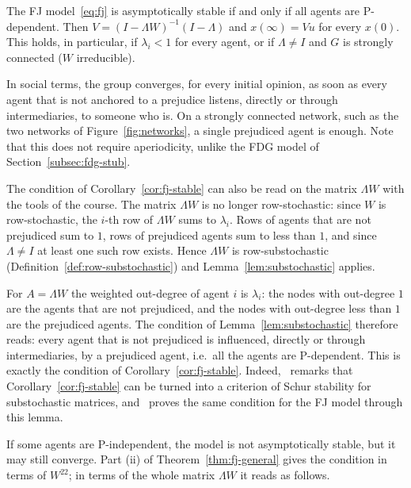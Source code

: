 \begin{corollary}
\label{cor:fj-stable}
The FJ model~\eqref{eq:fj} is asymptotically stable if and only if all agents are
P-dependent. Then $V = (I - \Lambda W)^{-1}(I - \Lambda)$ and $x(\infty) = Vu$ for
every $x(0)$. This holds, in particular, if $\lambda_i < 1$ for every agent, or if
$\Lambda \neq I$ and $G$ is strongly connected ($W$ irreducible).
\end{corollary}

In social terms, the group converges, for every initial opinion, as soon as every agent
that is not anchored to a prejudice listens, directly or through intermediaries, to
someone who is. On a strongly connected network, such as the two networks of
Figure~\ref{fig:networks}, a single prejudiced agent is enough. Note that this does not
require aperiodicity, unlike the FDG model of Section~\ref{subsec:fdg-stub}.

The condition of Corollary~\ref{cor:fj-stable} can also be read on the matrix
$\Lambda W$ with the tools of the course. The matrix $\Lambda W$ is no longer
row-stochastic: since $W$ is row-stochastic, the $i$-th row of $\Lambda W$ sums to
$\lambda_i$. Rows of agents that are not prejudiced sum to $1$, rows of prejudiced
agents sum to less than $1$, and since $\Lambda \neq I$ at least one such row exists.
Hence $\Lambda W$ is row-substochastic (Definition~\ref{def:row-substochastic}) and
Lemma~\ref{lem:substochastic} applies.

For $A = \Lambda W$ the weighted out-degree of agent $i$ is $\lambda_i$: the nodes with
out-degree $1$ are the agents that are not prejudiced, and the nodes with out-degree
less than $1$ are the prejudiced agents. The condition of
Lemma~\ref{lem:substochastic} therefore reads: every agent that is not prejudiced is
influenced, directly or through intermediaries, by a prejudiced agent, i.e.\ all the
agents are P-dependent. This is exactly the condition of
Corollary~\ref{cor:fj-stable}. Indeed,~\cite{proskurnikov2017tutorial} remarks that
Corollary~\ref{cor:fj-stable} can be turned into a criterion of Schur stability for
substochastic matrices, and~\cite{bullo2024lns} proves the same condition for the FJ
model through this lemma.

If some agents are P-independent, the model is not asymptotically stable, but it may
still converge. Part (ii) of Theorem~\ref{thm:fj-general} gives the condition in terms
of $W^{22}$; in terms of the whole matrix $\Lambda W$ it reads as follows.

